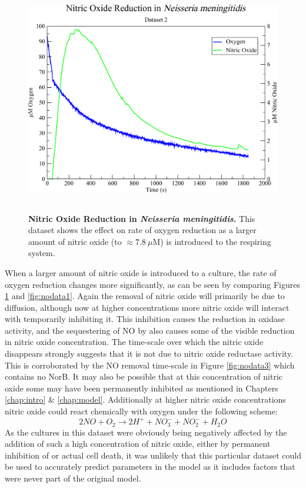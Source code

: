 \begin{figure}[tbp]
 \centering
 \includegraphics[height=10cm, clip=true]{./06-noreduction/data/aer-no-data2.pdf}
 \caption[{Nitric Oxide Reduction in \textit{Neisseria meningitidis}.}]{{\bf Nitric Oxide Reduction in \textit{Neisseria meningitidis}.} This dataset shows the effect on rate of oxygen reduction as a larger amount of nitric oxide (to $\approx 7.8~\mu \mathrm{M}$) is introduced to the respiring system.}
 \label{fig:nodata2}
\end{figure}
When a larger amount of nitric oxide is introduced to a culture, the rate of oxygen reduction changes more significantly, as can be seen by comparing Figures \ref{fig:nodata2} and \ref{fig:nodata1}. Again the removal of nitric oxide will primarily be due to diffusion, although now at higher concentrations more nitric oxide will interact with \cbbthree{} temporarily inhibiting it. This inhibition causes the reduction in oxidase activity, and the sequestering of NO by \cbbthree{} also causes some of the visible reduction in nitric oxide concentration. The time-scale over which the nitric oxide disappears strongly suggests that it is not due to nitric oxide reductase activity. This is corroborated by the NO removal time-scale in Figure \ref{fig:nodata3} which contains no NorB. It may also be possible that at this concentration of nitric oxide some \cbbthree{} may have been permanently inhibited as mentioned in Chapters \ref{chap:intro} \& \ref{chap:model}. Additionally at higher nitric oxide concentrations nitric oxide could
react chemically with oxygen under the following scheme:
\begin{equation*}
 2NO + O_2 \rightarrow 2H^+ + NO_3^- + NO_2^- + H_2O
\end{equation*}
\noindent As the cultures in this dataset were obviously being negatively affected by the addition of such a high concentration of nitric oxide, either by permanent inhibition of \cbbthree{} or actual cell death, it was unlikely that this particular dataset could be used to accurately predict parameters in the model as it includes factors that were never part of the original model.

